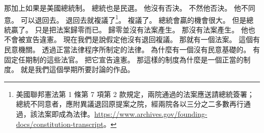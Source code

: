 \hypertarget{w01:cue:303}{}那加上如果是美國總統制。
\hypertarget{w01:cue:304}{}總統也是民選。
\hypertarget{w01:cue:305}{}他沒有否決。
\hypertarget{w01:cue:306}{}不然他否決。
\hypertarget{w01:cue:307}{}他不同意。
\hypertarget{w01:cue:308}{}可以退回去。
\hypertarget{w01:cue:309}{}退回去就複議了\footnote{美國聯邦憲法第 1 條第 7 項第 2 款規定，兩院通過的法案應送請總統簽署；總統不同意者，應附異議退回原提案之院，經兩院各以三分之二多數再行通過，該法案即成為法律。\url{https://www.archives.gov/founding-docs/constitution-transcript}。}。
\hypertarget{w01:cue:310}{}複議了。
\hypertarget{w01:cue:311}{}總統會贏的機會很大。
\hypertarget{w01:cue:312}{}但是總統贏了。
\hypertarget{w01:cue:313}{}只是把法案歸零而已。
\hypertarget{w01:cue:314}{}歸零並沒有法案產生。
\hypertarget{w01:cue:315}{}那沒有法案產生。
\hypertarget{w01:cue:316}{}他也不會被宣告違憲。
\hypertarget{w01:cue:317}{}現在我們是說假定他沒有退回複議。
\hypertarget{w01:cue:318}{}那就有一個法案。
\hypertarget{w01:cue:319}{}這個有民意機關。
\hypertarget{w01:cue:320}{}透過正當法律程序所制定的法律。
\hypertarget{w01:cue:321}{}為什麼有一個沒有民意基礎的。
\hypertarget{w01:cue:322}{}有固定任期制的這些法官。
\hypertarget{w01:cue:323}{}把它宣告違憲。
\hypertarget{w01:cue:324}{}那這樣的制度為什麼是一個正當的制度。
\hypertarget{w01:cue:325}{}就是我們這個學期所要討論的作品。

